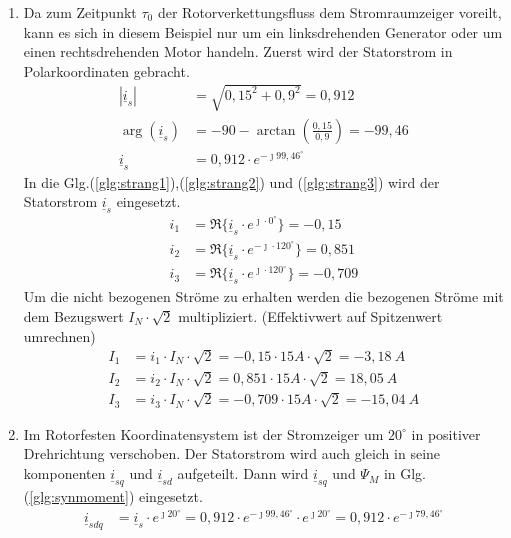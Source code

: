 \begin{solution}
	\begin{enumerate}
		\item Da zum Zeitpunkt $\tau_0$ der Rotorverkettungsfluss dem Stromraumzeiger voreilt, kann es sich in diesem Beispiel nur um ein linksdrehenden Generator oder um einen rechtsdrehenden Motor handeln. Zuerst wird der Statorstrom in Polarkoordinaten gebracht.
		\begin{align}
			|\underline{i}_s|  &= \sqrt{0,15^2 + 0,9^2}= 0,912 \\
			\arg(\underline{i}_s) & =-90 - \arctan\left (\frac{0,15}{0,9} \right ) =-99,46 \\
			\underline{i}_s  &= 0,912 \cdot e^{-\jmath 99,46 ^\circ}
		\end{align}
		In die Glg.(\ref{glg:strang1}),(\ref{glg:strang2}) und (\ref{glg:strang3}) wird der Statorstrom $\underline{i}_s$ eingesetzt.
		\begin{align}
			i_1 & = \Re \{ \underline{i}_s \cdot e^{\jmath \cdot 0 ^\circ} \} = -0,15\\
			i_2 & = \Re \{ \underline{i}_s \cdot e^{-\jmath \cdot 120 ^\circ} \} = 0,851 \\
			i_3 & = \Re \{ \underline{i}_s \cdot e^{\jmath \cdot 120 ^\circ} \}=  -0,709
		\end{align}
		Um die nicht bezogenen Ströme zu erhalten werden die bezogenen Ströme mit dem Bezugswert $I_N \cdot \sqrt{2}$ multipliziert. (Effektivwert auf Spitzenwert umrechnen)
		\begin{align}
			I_1 & = i_1 \cdot I_N \cdot \sqrt{2} = -0,15 \cdot 15 A \cdot \sqrt{2} =-3,18~A \\
			I_2 & = i_2 \cdot I_N \cdot \sqrt{2} = 0,851 \cdot 15 A \cdot \sqrt{2} =18,05~A \\
			I_3 & = i_3 \cdot I_N \cdot \sqrt{2} =-0,709 \cdot 15 A \cdot \sqrt{2} =-15,04~A
		\end{align}
		\item Im Rotorfesten Koordinatensystem ist der Stromzeiger um $20^\circ$ in positiver Drehrichtung verschoben. Der Statorstrom wird auch gleich in seine komponenten $\underline{i}_{sq}$ und $\underline{i}_{sd}$ aufgeteilt. Dann wird $\underline{i}_{sq}$ und $\Psi_M$ in Glg.(\ref{glg:synmoment}) eingesetzt.
		\begin{align}
			\underline{i}_{sdq} & = \underline{i}_s \cdot e^{\jmath 20 ^\circ} = 0,912 \cdot e^{-\jmath 99,46 ^\circ} \cdot e^{\jmath 20 ^\circ} = 0,912 \cdot e^{-\jmath 79,46 ^\circ} \\

\end{align}
\end{enumerate}
\end{solution}
